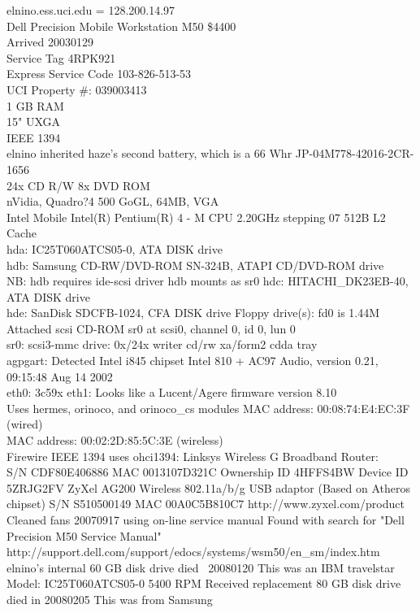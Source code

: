 \documentclass[12pt,twoside]{article}
\begin{document}
elnino.ess.uci.edu = 128.200.14.97 \\
Dell Precision Mobile Workstation M50 \$4400\\
Arrived 20030129 \\
Service Tag 4RPK921 \\
Express Service Code 103-826-513-53 \\
UCI Property \#: 039003413 \\
1 GB RAM\\
15" UXGA\\
IEEE 1394\\
elnino inherited haze's second battery, which is a 66 Whr JP-04M778-42016-2CR-1656\\
24x CD R/W 8x DVD ROM\\
nVidia, Quadro?4 500 GoGL, 64MB, VGA\\
Intel Mobile Intel(R) Pentium(R) 4 - M CPU 2.20GHz stepping 07 512B L2 Cache\\
hda: IC25T060ATCS05-0, ATA DISK drive\\
hdb: Samsung CD-RW/DVD-ROM SN-324B, ATAPI CD/DVD-ROM drive\\
NB: hdb requires ide-scsi driver
hdb mounts as sr0
hdc: HITACHI\_DK23EB-40, ATA DISK drive\\
hde: SanDisk SDCFB-1024, CFA DISK drive
Floppy drive(s): fd0 is 1.44M\\
Attached scsi CD-ROM sr0 at scsi0, channel 0, id 0, lun 0\\
sr0: scsi3-mmc drive: 0x/24x writer cd/rw xa/form2 cdda tray\\
agpgart: Detected Intel i845 chipset
Intel 810 + AC97 Audio, version 0.21, 09:15:48 Aug 14 2002\\
eth0: 3c59x
eth1: Looks like a Lucent/Agere firmware version 8.10\\
Uses hermes, orinoco, and orinoco\_cs modules
MAC address: 00:08:74:E4:EC:3F (wired) \\
MAC address: 00:02:2D:85:5C:3E (wireless) \\
Firewire IEEE 1394 uses ohci1394: 
Linksys Wireless G Broadband Router:\\
S/N CDF80E406886
MAC 0013107D321C
Ownership ID 4HFFS4BW
Device ID 5ZRJG2FV
ZyXel AG200 Wireless 802.11a/b/g USB adaptor (Based on Atheros chipset)
S/N S510500149
MAC 00A0C5B810C7
http://www.zyxel.com/product
Cleaned fans 20070917 using on-line service manual
Found with search for "Dell Precision M50 Service Manual"
http://support.dell.com/support/edocs/systems/wsm50/en\_sm/index.htm
elnino's internal 60 GB disk drive died ~20080120
This was an IBM travelstar Model: IC25T060ATCS05-0 5400 RPM
Received replacement 80 GB disk drive died in 20080205
This was from Samsung 
\end{document}
